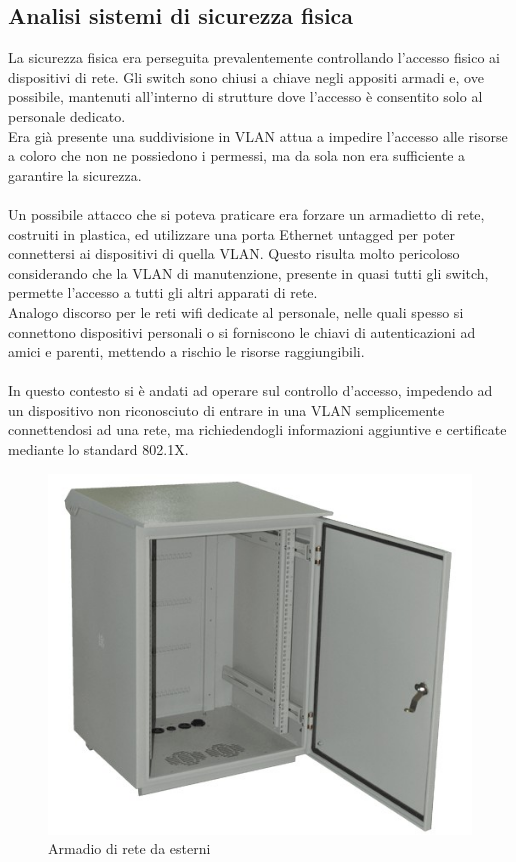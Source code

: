 \documentclass[Realizzazione.tex]{subfiles}
\begin{document}
\subsection{Analisi sistemi di sicurezza fisica}
La sicurezza fisica era perseguita prevalentemente controllando l'accesso fisico ai dispositivi di rete. Gli switch sono chiusi a chiave negli appositi armadi e, ove possibile, mantenuti all'interno di strutture dove l'accesso è consentito solo al personale dedicato. \\
Era già presente una suddivisione in VLAN attua a impedire l'accesso alle risorse a coloro che non ne possiedono i permessi, ma da sola non era sufficiente a garantire la sicurezza. \\\\
Un possibile attacco che si poteva praticare era forzare un armadietto di rete, costruiti in plastica, ed utilizzare una porta Ethernet untagged per poter connettersi ai dispositivi di quella VLAN. Questo risulta molto pericoloso considerando che la VLAN di manutenzione, presente in quasi tutti gli switch, permette l'accesso a tutti gli altri apparati di rete. \\
Analogo discorso per le reti wifi dedicate al personale, nelle quali spesso si connettono dispositivi personali o si forniscono le chiavi di autenticazioni ad amici e parenti, mettendo a rischio le risorse raggiungibili. \\\\
In questo contesto si è andati ad operare sul controllo d'accesso, impedendo ad un dispositivo non riconosciuto di entrare in una VLAN semplicemente connettendosi ad una rete, ma richiedendogli informazioni aggiuntive e certificate mediante lo standard 802.1X.

\begin{figure}[H]
	\centering
	\includegraphics[width=0.5\linewidth]{"images/Outdoor rack"}
	\caption{Armadio di rete da esterni}
	\label{fig:Armadio di rete da esterni}
\end{figure}
\end{document}
